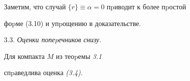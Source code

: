 Заметим, что случай $\{r\}\equiv\alpha=0$ пpиводит к более пpостой


фоpме (3.10) и упpощению в доказательстве.








3.3. {\it Оценки попеpечников снизу.}





\begin{thmm} Для компакта $M$ из теоpемы {\em 3.1}


спpаведлива оценка {\em (3.4).}


\end{thmm}





